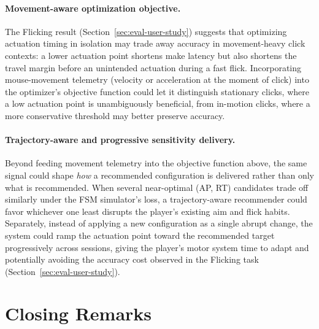 \paragraph{Movement-aware optimization objective.}
The Flicking result (Section~\ref{sec:eval-user-study}) suggests that optimizing
actuation timing in isolation may trade away accuracy in movement-heavy click
contexts: a lower actuation point shortens make latency but also shortens the
travel margin before an unintended actuation during a fast flick. Incorporating
mouse-movement telemetry (velocity or acceleration at the moment of click) into
the optimizer's objective function could let it distinguish stationary clicks,
where a low actuation point is unambiguously beneficial, from in-motion clicks,
where a more conservative threshold may better preserve accuracy.

\paragraph{Trajectory-aware and progressive sensitivity delivery.}
Beyond feeding movement telemetry into the objective function above, the same
signal could shape \emph{how} a recommended configuration is delivered rather
than only what is recommended. When several near-optimal (AP, RT) candidates
trade off similarly under the FSM simulator's loss, a trajectory-aware
recommender could favor whichever one least disrupts the player's existing
aim and flick habits. Separately, instead of applying a new configuration as
a single abrupt change, the system could ramp the actuation point toward the
recommended target progressively across sessions, giving the player's motor
system time to adapt and potentially avoiding the accuracy cost observed in
the Flicking task (Section~\ref{sec:eval-user-study}).

\section{Closing Remarks}

